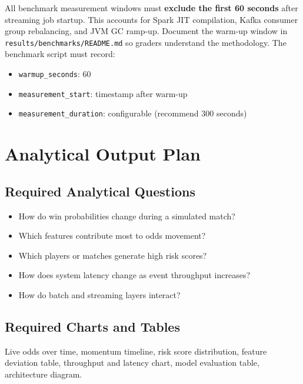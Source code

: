 \documentclass[11pt,a4paper]{article}
\begin{document}
\begin{importantbox}
All benchmark measurement windows must \textbf{exclude the first 60 seconds} after streaming
job startup. This accounts for Spark JIT compilation, Kafka consumer group rebalancing, and JVM
GC ramp-up. Document the warm-up window in \texttt{results/benchmarks/README.md} so graders
understand the methodology. The benchmark script must record:
\begin{itemize}[nosep]
  \item \texttt{warmup\_seconds}: 60
  \item \texttt{measurement\_start}: timestamp after warm-up
  \item \texttt{measurement\_duration}: configurable (recommend 300 seconds)
\end{itemize}
\end{importantbox}

\section{Analytical Output Plan}

\subsection{Required Analytical Questions}

\begin{itemize}[nosep]
  \item How do win probabilities change during a simulated match?
  \item Which features contribute most to odds movement?
  \item Which players or matches generate high risk scores?
  \item How does system latency change as event throughput increases?
  \item How do batch and streaming layers interact?
\end{itemize}

\subsection{Required Charts and Tables}

Live odds over time, momentum timeline, risk score distribution, feature deviation table,
throughput and latency chart, model evaluation table, architecture diagram.
\end{document}
